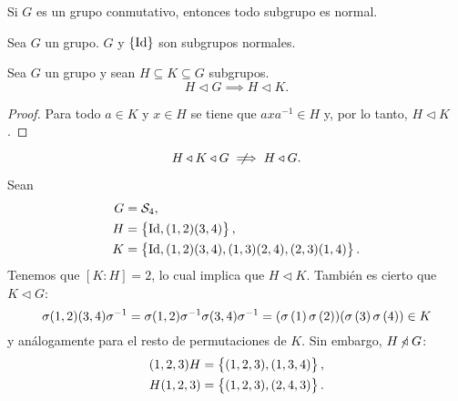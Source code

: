 \begin{obs}
    Si $G$ es un grupo conmutativo, entonces todo subgrupo es normal.
\end{obs}

\begin{obs}
    Sea $G$ un grupo. $G$ y $\left\{\operatorname{Id}\right\}$ son subgrupos normales.
\end{obs}

\begin{prop}
    Sea $G$ un grupo y sean $H \subseteq K \subseteq G$ subgrupos.
    \[
        H \triangleleft G \implies H \triangleleft K.
    \]
\end{prop}

\begin{proof}
    Para todo $a \in K$ y $x \in H$ se tiene que $axa^{-1} \in H$ y, por lo tanto, $H \triangleleft K$.
\end{proof}

\begin{obs}
    \[
        H \triangleleft K \triangleleft G \notimplies H \triangleleft G.
    \]
\end{obs}

\begin{example}
    Sean
    \begin{align*}
        G &= \mathcal{S}_4,\\
        H &= \left\{ \operatorname{Id}, (1,2)(3,4)\right\}, \\
        K &= \left\{ \operatorname{Id}, (1,2)(3,4), (1,3)(2,4), (2,3)(1,4)\right\}.
    \end{align*}
    Tenemos que $[K : H] = 2$, lo cual implica que $H \triangleleft K$. También es cierto que $K \triangleleft G$:
    \[
        \sigma(1,2)(3,4)\sigma^{-1} = \sigma(1,2)\sigma^{-1}\sigma(3,4)\sigma^{-1} = (\sigma\left( 1\right) \sigma\left( 2\right))
        (\sigma\left( 3\right) \sigma\left( 4\right)) \in K
    \]
    y análogamente para el resto de permutaciones de $K$. Sin embargo,
    $H \centernot\triangleleft G$:
    \[
        \begin{aligned}
            (1,2,3)H &= \left\{(1,2,3), (1,3,4)\right\}, \\
            H(1,2,3) &= \left\{(1,2,3), (2,4,3)\right\}.
        \end{aligned}
    \]
\end{example}

